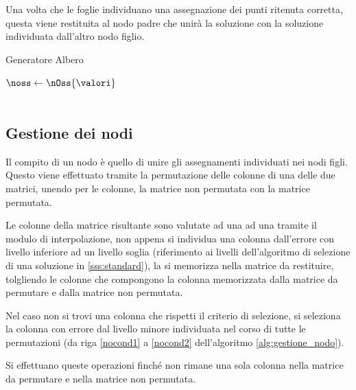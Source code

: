 \documentclass[a4paper,12pt]{report}
\begin{document}
  Una volta che le foglie individuano una assegnazione dei punti ritenuta corretta, questa viene restituita al nodo padre che unirà la soluzione con la soluzione individuata dall'altro nodo figlio.
  \begin{algorithm}
  \caption{Generatore Albero}\label{alg:genera_albero}
  $\noss \leftarrow \nOss{\valori}$ \\
  \Return {} \\

  \end{algorithm}
  \subsection{Gestione dei nodi}
  \label{ss:non_foglia}
  Il compito di un nodo è quello di unire gli assegnamenti individuati nei nodi figli. Questo viene effettuato tramite la permutazione delle colonne di una delle due matrici, unendo per le colonne, la matrice non permutata con la matrice permutata.

  Le colonne della matrice risultante sono valutate ad una ad una tramite il modulo di interpolazione, non appena si individua una colonna dall'errore con livello inferiore ad un livello soglia (riferimento ai livelli dell'algoritmo di selezione di una soluzione in \ref{sss:standard}), la si memorizza nella matrice da restituire, tolgliendo le colonne che compongono la colonna memorizzata dalla matrice da permutare e dalla matrice non permutata.

  Nel caso non si trovi una colonna che rispetti il criterio di selezione, si seleziona la colonna con errore dal livello minore individuata nel corso di tutte le permutazioni (da riga \ref{nocond1} a \ref{nocond2} dell'algoritmo \ref{alg:gestione_nodo}).

  Si effettuano queste operazioni finché non rimane una sola colonna nella matrice da permutare e nella matrice non permutata.
\end{document}
